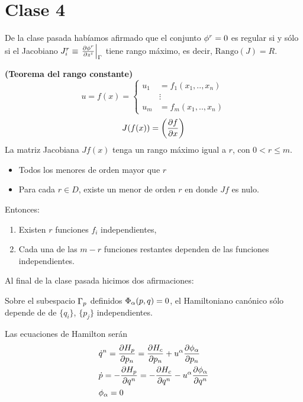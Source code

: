 \section{Clase 4}
De la clase pasada habíamos afirmado que el conjunto $\phi^r=0$ es regular si y sólo si el Jacobiano $J_i^r\equiv \eval{\pdv{\f^r}{z^{i}}}_\G $ tiene rango máximo, es decir, $\text{Rango}(J)=R$. 

\begin{teor}	\textbf{(Teorema del rango constante)}
\begin{equation}
u=f(x)=\left\{\begin{array}{ll}
  u_1&=f_1(x_1,..,x_n)\\
  &\vdots\\
  u_m&=f_m(x_1,..,x_n)
\end{array}
\right.
\end{equation}
\begin{equation}
  J(f(x))=\left(\pdv{f}{x}\right)
\end{equation}
La matriz Jacobiana $Jf(x)$ tenga un rango máximo igual a $r$, con $0<r\leq m$.
\begin{itemize}
	\item Todos los menores de orden  mayor que $r$
	\item Para cada $r\in D$, existe un menor de orden $r$ en donde $Jf$ es nulo.
\end{itemize}
Entonces:
\begin{enumerate}
	\item Existen $r$ funciones $f_i$ independientes,
	\item Cada una de las $m-r$ funciones restantes dependen de las funciones independientes.
\end{enumerate}
\end{teor}

Al final de la clase pasada hicimos dos afirmaciones:
\begin{Propo}
	Sobre el subespacio $\Gamma_p$ definidos $\Phi_\alpha (p,q)=0$, el Hamiltoniano canónico sólo depende de de $\{q_i\}$, $\{p_j\}$ independientes.
\end{Propo}
\begin{Propo}
	Las ecuaciones de Hamilton serán 
	\begin{equation}
\begin{split}
  &\dot{q}^n =\pdv{H_p}{p_n }=\pdv{H_c}{p_n }+u^\alpha \pdv{\phi_\alpha}{p_n }\\
  &\dot{p}=-\pdv{H_p}{q^n }=-\pdv{H_c}{q^n}-u^\alpha \pdv{\phi_\alpha}{q^n }\\
 &\phi_\alpha =0
\end{split}
\end{equation}
\end{Propo}

